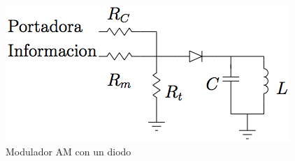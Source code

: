 \documentclass{article}
\begin{document}
\begin{figure}[htbp]
\centering
\includegraphics{images/undiodoam.png}
\caption{Modulador AM con un diodo}
\end{figure}



    
    
    
    
\end{document}
